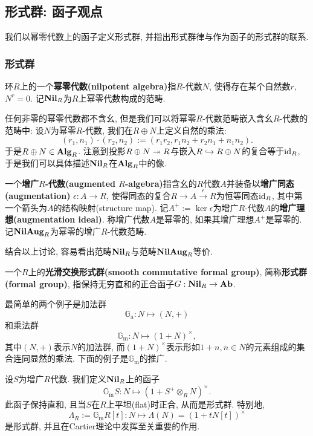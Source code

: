 \subsection{形式群: 函子观点}
我们以幂零代数上的函子定义形式群, 并指出形式群律与作为函子的形式群的联系.

\subsubsection{形式群}
环$R$上的一个\textbf{幂零代数(nilpotent algebra)}指$R$-代数$N$, 使得存在某个自然数$r$, $N^r = 0$.
记$\mathbf{Nil}_R$为$R$上幂零代数构成的范畴.

任何非零的幂零代数都不含幺, 但是我们可以将幂零$R$-代数范畴嵌入含幺$R$-代数的范畴中: 设$N$为幂零$R$-代数, 我们在$R\oplus N$上定义自然的乘法:\[(r_1, n_1)\cdot(r_2, n_2) := (r_1r_2, r_1n_2 + r_2n_1 + n_1n_2).\]
于是$R\oplus N\in\mathbf{Alg}_R$. 注意到投影$R\oplus N\twoheadrightarrow R$与嵌入$R\hookrightarrow R\oplus N$的复合等于$\operatorname{id}_R$,
于是我们可以具体描述$\mathbf{Nil}_R$在$\mathbf{Alg}_R$中的像.
\begin{definition}
    一个\textbf{增广$R$-代数(augmented $R$-algebra)}指含幺的$R$代数$A$并装备以\textbf{增广同态(augmentation)} $\epsilon : A\to R$, 使得同态的复合$R\to A\stackrel{\epsilon}{\to} R$为恒等同态$\operatorname{id}_R$,
    其中第一个箭头为$A$的结构映射(structure map). 记$A^+ := \ker\epsilon$为增广$R$-代数$A$的\textbf{增广理想(augmentation ideal)}.
    称增广代数$A$是幂零的, 如果其增广理想$A^+$是幂零的. 记$\mathbf{NilAug}_R$为幂零的增广$R$-代数范畴.
\end{definition}
结合以上讨论, 容易看出范畴$\mathbf{Nil}_R$与范畴$\mathbf{NilAug}_R$等价.

\begin{definition}
    一个$R$上的\textbf{光滑交换形式群(smooth commutative formal group)}, 简称\textbf{形式群(formal group)}, 指保持无穷直和的正合函子$G : \mathbf{Nil}_R\to\mathbf{Ab}$.
\end{definition}
最简单的两个例子是加法群\[\mathbb{G}_\mathrm{a} : N\mapsto (N, +)\]和乘法群\[\mathbb{G}_\mathrm{m} : N\mapsto (1 + N)^\times,\]
其中$(N, +)$表示$N$的加法群, 而$(1 + N)^\times$表示形如$1 + n, n\in N$的元素组成的集合连同显然的乘法.
下面的例子是$\mathbb{G}_\mathrm{m}$的推广.
\begin{example}
    设$S$为增广$R$代数. 我们定义$\mathbf{Nil}_R$上的函子\[\mathbb{G}_\mathrm{m}S : N\mapsto (1 + S^+\otimes_R N)^\times.\]
    此函子保持直和, 且当$S$在$R$上平坦(flat)时正合, 从而是形式群.
    特别地, \[\Lambda_R :=\mathbb{G}_\mathrm{m}R[t] : N \mapsto \Lambda(N) = (1 + tN[t])^\times\]是形式群,
    并且在Cartier理论中发挥至关重要的作用.
\end{example}

